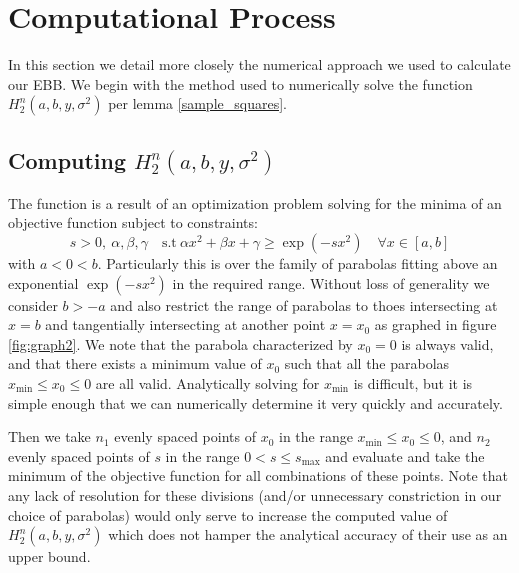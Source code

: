 \documentclass[aap,preprint]{imsart}
\begin{document}
\section{Computational Process}\label{appendix2}
In this section we detail more closely the numerical approach we used to calculate our EBB.
We begin with the method used to numerically solve the function $ H_2^n(a,b,y,\sigma^2) $ per lemma \ref{sample_squares}.

\subsection{Computing $H_2^n(a,b,y,\sigma^2)$}
The function is a result of an optimization problem solving for the minima of an objective function subject to constraints: $$s>0,~\alpha,\beta,\gamma\quad  \text{s.t}~\alpha x^2 + \beta x + \gamma\ge\exp(-sx^2)\quad \forall x\in[a,b]$$
with $a<0<b$. Particularly this is over the family of parabolas fitting above an exponential $\exp(-sx^2)$ in the required range. Without loss of generality we consider $b>-a$ and also restrict the range of parabolas to thoes intersecting at $x=b$ and tangentially intersecting at another point $x=x_0$ as graphed in figure \ref{fig:graph2}. We note that the parabola characterized by $x_0=0$ is always valid, and that there exists a minimum value of $x_0$ such that all the parabolas $x_\text{min}\le x_0\le 0$ are all valid.
Analytically solving for $x_\text{min}$ is difficult, but it is simple enough that we can numerically determine it very quickly and accurately.

Then we take $n_1$ evenly spaced points of $x_0$ in the range $x_\text{min}\le x_0\le 0$, and $n_2$ evenly spaced points of $s$ in the range $0<s\le s_\text{max}$ and evaluate and take the minimum of the objective function for all combinations of these points. Note that any lack of resolution for these divisions (and/or unnecessary constriction in our choice of parabolas) would only serve to increase the computed value of $H_2^n(a,b,y,\sigma^2)$ which does not hamper the analytical accuracy of their use as an upper bound.
\end{document}
